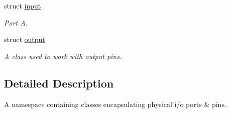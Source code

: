 \begin{DoxyCompactItemize}
struct \hyperlink{structavrpp_1_1ports_1_1input}{input}
\begin{DoxyCompactList}\small\item\em Port A. \item\end{DoxyCompactList}\item 
struct \hyperlink{structavrpp_1_1ports_1_1output}{output}
\begin{DoxyCompactList}\small\item\em A class used to work with output pins. \item\end{DoxyCompactList}\end{DoxyCompactItemize}


\subsection{Detailed Description}
A namespace containing classes encapsulating physical i/o ports \& pins. 